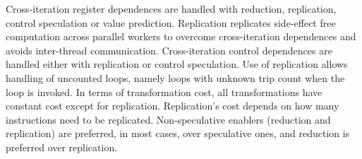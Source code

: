 Cross-iteration register dependences
are handled with reduction, replication, control speculation or value
prediction. Replication replicates side-effect free computation across
parallel workers to overcome cross-iteration dependences and avoids
inter-thread communication.
%
Cross-iteration control dependences are handled either with
replication or control speculation.
Use of replication allows handling of uncounted loops, namely loops
with unknown trip count when the loop is invoked.
%
In terms of transformation cost, all transformations have constant
cost except for replication.  Replication's cost depends on how many
instructions need to be replicated. Non-speculative enablers
(reduction and replication) are preferred, in most cases, over
speculative ones, and reduction is preferred over replication.


%

%
%
%
%
%
%
%
